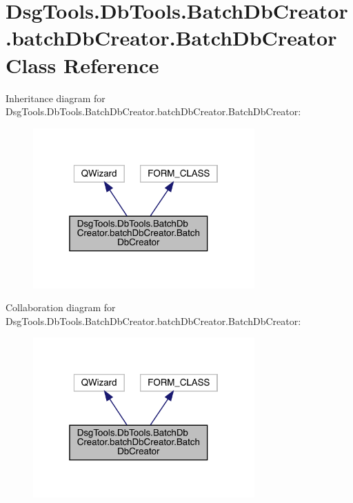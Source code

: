 \hypertarget{class_dsg_tools_1_1_db_tools_1_1_batch_db_creator_1_1batch_db_creator_1_1_batch_db_creator}{}\section{Dsg\+Tools.\+Db\+Tools.\+Batch\+Db\+Creator.\+batch\+Db\+Creator.\+Batch\+Db\+Creator Class Reference}
\label{class_dsg_tools_1_1_db_tools_1_1_batch_db_creator_1_1batch_db_creator_1_1_batch_db_creator}


Inheritance diagram for Dsg\+Tools.\+Db\+Tools.\+Batch\+Db\+Creator.\+batch\+Db\+Creator.\+Batch\+Db\+Creator\+:
\nopagebreak
\begin{figure}[H]
\begin{center}
\leavevmode
\includegraphics[width=241pt]{class_dsg_tools_1_1_db_tools_1_1_batch_db_creator_1_1batch_db_creator_1_1_batch_db_creator__inherit__graph}
\end{center}
\end{figure}


Collaboration diagram for Dsg\+Tools.\+Db\+Tools.\+Batch\+Db\+Creator.\+batch\+Db\+Creator.\+Batch\+Db\+Creator\+:
\nopagebreak
\begin{figure}[H]
\begin{center}
\leavevmode
\includegraphics[width=241pt]{class_dsg_tools_1_1_db_tools_1_1_batch_db_creator_1_1batch_db_creator_1_1_batch_db_creator__coll__graph}
\end{center}
\end{figure}
